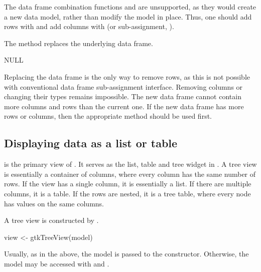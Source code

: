 The data frame combination functions  and
 are unsupported, as they would create a new data
model, rather than modify the model in place. Thus, one should add
rows with  and add columns with
 (or sub-assignment, 
\method{[\ASSIGN}{RGtkDataFrame}).

The  method replaces the underlying
data frame.
\begin{Schunk}
\begin{Soutput}
NULL
\end{Soutput}
\end{Schunk}
%
Replacing the data frame is the only way to remove rows, as this is
not possible with conventional data frame sub-assignment
interface. Removing columns or changing their types remains
impossible. The new data frame cannot contain more columns and rows
than the current one. If the new data frame has more rows or columns,
then the appropriate  method should be used first.

\subsection{Displaying data as a list or table}
\label{sec:RGtk2:mvc:GtkTreeView}

 is the primary view of .  It
serves as the list, table and tree widget in \GTK. A tree view is
essentially a container of columns, where every column has the same
number of rows. If the view has a single column, it is essentially a
list. If there are multiple columns, it is a table. If the rows are
nested, it is a tree table, where every node has values on the same
columns.

A tree view is constructed by . 
\begin{Schunk}
\begin{Sinput}
 view <- gtkTreeView(model)
\end{Sinput}
\end{Schunk}
Usually, as in the above, the model is passed to the
constructor. Otherwise, the model may be accessed with
 and .

